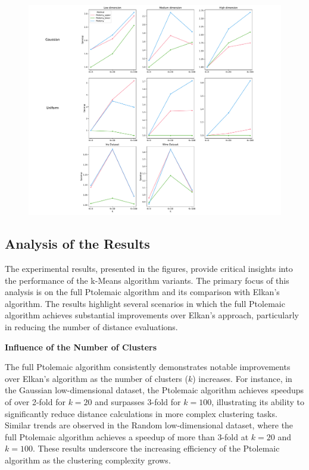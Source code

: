 \begin{figure}
	\centering
	\includegraphics[width=\textwidth]{fig/combined_plot.pdf}
	\caption{}
	\label{fig:combined}
\end{figure}


\subsection{Analysis of the Results}

The experimental results, presented in the figures, provide critical insights into the performance of the k-Means algorithm variants. The primary focus of this analysis is on the full Ptolemaic algorithm and its comparison with Elkan’s algorithm. The results highlight several scenarios in which the full Ptolemaic algorithm achieves substantial improvements over Elkan’s approach, particularly in reducing the number of distance evaluations.

\textbf{Influence of the Number of Clusters}

The full Ptolemaic algorithm consistently demonstrates notable improvements over Elkan’s algorithm as the number of clusters ($k$) increases. For instance, in the Gaussian low-dimensional dataset, the Ptolemaic algorithm achieves speedups of over 2-fold for $k = 20$ and surpasses 3-fold for $k = 100$, illustrating its ability to significantly reduce distance calculations in more complex clustering tasks. Similar trends are observed in the Random low-dimensional dataset, where the full Ptolemaic algorithm achieves a speedup of more than 3-fold at $k = 20$ and $k = 100$. These results underscore the increasing efficiency of the Ptolemaic algorithm as the clustering complexity grows.

